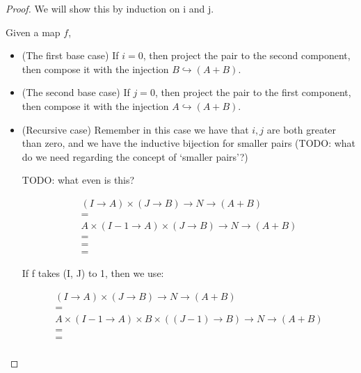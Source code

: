 \documentclass{proc-l}
\theoremstyle{definition}
\theoremstyle{remark}
\numberwithin{equation}{section}
\begin{document}
\begin{proof}
We will show this by induction on i and j.

Given a map \(f\),

\begin{itemize}
\item (The first base case) If \(i = 0\), then project the pair to the second component, then compose it with the injection \(B \hookrightarrow (A + B)\).

\item (The second base case) If \(j = 0\), then project the pair to the first component, then compose it with the injection \(A \hookrightarrow (A + B)\).

\item (Recursive case) Remember in this case we have that \(i, j\) are both greater than zero, and we have the inductive bijection for smaller pairs (TODO: what do we need regarding the concept of `smaller pairs'?)

TODO: what even is this?

\begin{align*}
(I \to A) \times (J \to B) \to N \to (A + B) \\
= \tag{by factoring an A out of \(I \to A\)? Need a lemma for that?} \\
A \times (I-1 \to A) \times (J \to B) \to N \to (A + B) \\
= \\
= \tag{by invoking the canonical bijection recursively} \\
= \tag{by injecting \(A \to (A + B)\)}
\end{align*}

If f takes (I, J) to 1, then
we use:

\begin{align*}
(I \to A) \times (J \to B) \to N \to (A + B) \\
= \tag{by factoring an A out of \(I \to A\)? Need a lemma for that?} \\
A \times (I-1 \to A) \times B \times ((J-1) \to B) \to N \to (A + B) \\
= \tag{by invoking the canonical bijection recursively} \\
= \tag{by injecting \(A \to (A + B)\)} \\
\end{align*}
\end{itemize}

\end{proof}


\end{document}
